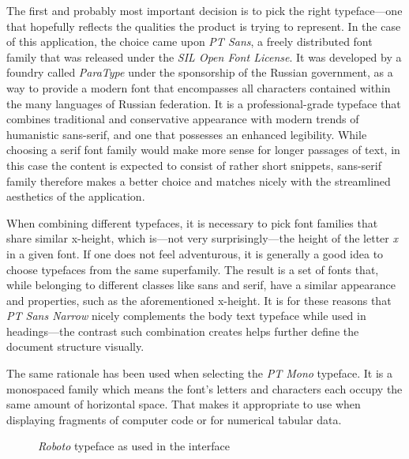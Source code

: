 \documentclass[thesis=M,english,hidelinks]{FITthesis}[2012/10/20]
\begin{document}
The first and probably most important decision is to pick the right typeface---one that hopefully reflects the qualities the product is trying to represent. In the case of this application, the choice came upon \textit{PT Sans}, a freely distributed font family that was released under the \textit{SIL Open Font License}. It was developed by a foundry called \textit{ParaType} under the sponsorship of the Russian government, as a way to provide a modern font that encompasses all characters contained within the many languages of Russian federation. It is a professional-grade typeface that combines traditional and conservative appearance with modern trends of humanistic sans-serif, and one that possesses an enhanced legibility. While choosing a serif font family would make more sense for longer passages of text, in this case the content is expected to consist of rather short snippets, sans-serif family therefore makes a better choice and matches nicely with the streamlined aesthetics of the application.

When combining different typefaces, it is necessary to pick font families that share similar x-height, which is---not very surprisingly---the height of the letter \textit{x} in a given font. If one does not feel adventurous, it is generally a good idea to choose typefaces from the same superfamily. The result is a set of fonts that, while belonging to different classes like sans and serif, have a similar appearance and properties, such as the aforementioned x-height. It is for these reasons that \textit{PT Sans Narrow} nicely complements the body text typeface while used in headings---the contrast such combination creates helps further define the document structure visually.

The same rationale has been used when selecting the \textit{PT Mono} typeface. It is a monospaced family which means the font's letters and characters each occupy the same amount of horizontal space. That makes it appropriate to use when displaying fragments of computer code or for numerical tabular data.

\begin{figure}
  \centering
  \setlength\fboxsep{0pt}
  \setlength\fboxrule{0.2pt}
  \caption{\textit{Roboto} typeface as used in the interface}
  \label{fig:roboto}
\end{figure}
\end{document}
